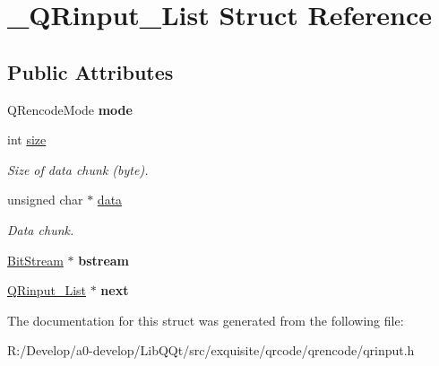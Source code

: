 \hypertarget{struct___q_rinput___list}{}\section{\+\_\+\+Q\+Rinput\+\_\+\+List Struct Reference}
\label{struct___q_rinput___list}
\subsection*{Public Attributes}
\begin{DoxyCompactItemize}
\item 
\mbox{\label{struct___q_rinput___list_a970bb9bf1b6fecea98c8cce84ad50743}} 
Q\+Rencode\+Mode {\bfseries mode}
\item 
\mbox{\label{struct___q_rinput___list_a0e95d1f205d72e7f8ed60d0f3c612b7d}} 
int \mbox{\hyperlink{struct___q_rinput___list_a0e95d1f205d72e7f8ed60d0f3c612b7d}{size}}
\begin{DoxyCompactList}\small\item\em Size of data chunk (byte). \end{DoxyCompactList}\item 
\mbox{\label{struct___q_rinput___list_ab1b2193ef5cbbc3ebac66c403c1e0d86}} 
unsigned char $\ast$ \mbox{\hyperlink{struct___q_rinput___list_ab1b2193ef5cbbc3ebac66c403c1e0d86}{data}}
\begin{DoxyCompactList}\small\item\em Data chunk. \end{DoxyCompactList}\item 
\mbox{\label{struct___q_rinput___list_ac5218ca09695bf13a42f7f18e9bf1d33}} 
\mbox{\hyperlink{struct_bit_stream}{Bit\+Stream}} $\ast$ {\bfseries bstream}
\item 
\mbox{\label{struct___q_rinput___list_a1f23d7348d94cb4107c57cd351e4a00c}} 
\mbox{\hyperlink{struct___q_rinput___list}{Q\+Rinput\+\_\+\+List}} $\ast$ {\bfseries next}
\end{DoxyCompactItemize}


The documentation for this struct was generated from the following file\+:\begin{DoxyCompactItemize}
\item 
R\+:/\+Develop/a0-\/develop/\+Lib\+Q\+Qt/src/exquisite/qrcode/qrencode/qrinput.\+h\end{DoxyCompactItemize}
